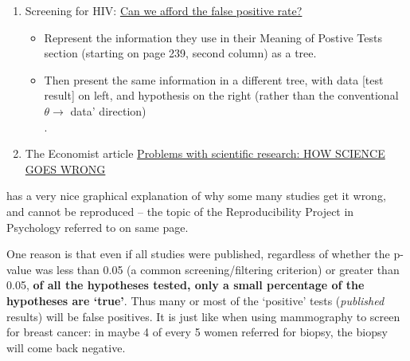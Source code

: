 \documentclass[]{book}
\providecommand{\tightlist}{%
  \setlength{\itemsep}{0pt}\setlength{\parskip}{0pt}}
\begin{document}
\begin{enumerate}
\def\labelenumi{\arabic{enumi}.}
\setcounter{enumi}{8}
\item
  Screening for HIV: \href{http://www.medicine.mcgill.ca/epidemiology/hanley/bios601/CandH-ch0102/MeyerPaukerHIVscreening.pdf}{Can we afford the false
  positive rate?}

  \begin{itemize}
  \tightlist
  \item
    Represent the information they use in their Meaning of Postive Tests section (starting on page 239, second column) as a tree.
  \item
    Then present the same information in a different tree, with data {[}test result{]} on left, and hypothesis on the right
    (rather than the conventional \(\theta \rightarrow\) data' direction)\\
    .
  \end{itemize}
\item
  The Economist article \href{http://www.biostat.mcgill.ca/hanley/bios601/CandH-ch0102/HowScienceGoesWrong.pdf}{Problems with scientific research: HOW SCIENCE GOES WRONG}
\end{enumerate}

has a very nice graphical explanation of why some many
studies get it wrong, and cannot be reproduced -- the topic of the Reproducibility Project in Psychology referred to on same page.

One reason is that even if all studies were published, regardless of whether the p-value was less than 0.05 (a common screening/filtering criterion) or greater than 0.05, \textbf{of all the hypotheses tested, only
a small percentage of the hypotheses are `true'}. Thus many or most of the `positive' tests (\emph{published} results) will be false positives. It is just like when using mammography to screen for breast cancer: in maybe 4 of every 5 women referred for biopsy, the biopsy will
come back negative.
\end{document}

